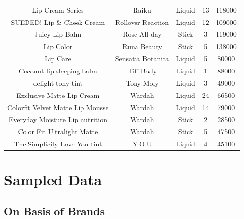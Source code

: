 \documentclass{article}
\begin{document}
\begin{longtable}{ccccc}
    Lip Cream Series                        & Raiku             & Liquid                       & 13              & 118000         \\
    SUEDED! Lip \& Cheek Cream              & Rollover Reaction & Liquid                       & 12              & 109000         \\
    Juicy Lip Balm                          & Rose All day      & Stick                        & 3               & 119000         \\
    Lip Color                               & Runa Beauty       & Stick                        & 5               & 138000         \\
    Lip Care                                & Sensatia Botanica & Liquid                       & 5               & 80000          \\
    Coconut lip sleeping balm               & Tiff Body         & Liquid                       & 1               & 88000          \\
    delight tony tint                       & Tony Moly         & Liquid                       & 3               & 49000          \\
    Exclusive Matte Lip Cream               & Wardah            & Liquid                       & 24              & 66500          \\
    Colorfit Velvet Matte Lip Mousse        & Wardah            & Liquid                       & 14              & 79000          \\
    Everyday Moisture Lip nutrition         & Wardah            & Stick                        & 2               & 28500          \\
    Color Fit Ultralight Matte              & Wardah            & Stick                        & 5               & 47500          \\
    The Simplicity Love You tint            & Y.O.U             & Liquid                       & 4               & 45100          \\
\end{longtable}

\restoregeometry %

\section{Sampled Data}
\subsection{On Basis of Brands}
\end{document}
